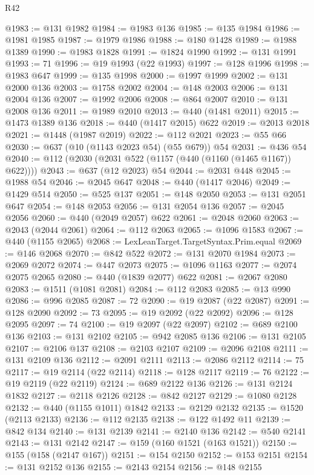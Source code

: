 \begin{lexlean}{R42}
\begin{coremodule}
@1983 := @131 @1982
@1984 := @1983 @136
@1985 := @135 @1984
@1986 := @1981 @1985
@1987 := @1979 @1986
@1988 := @180 @1428
@1989 := @1988 @1389
@1990 := @1983 @1828
@1991 := @1824 @1990
@1992 := @131 @1991
@1993 := 71
@1996 := @19 @1993 (@22 @1993)
@1997 := @128 @1996
@1998 := @1983 @647
@1999 := @135 @1998
@2000 := @1997 @1999
@2002 := @131 @2000 @136
@2003 := @1758 @2002
@2004 := @148 @2003
@2006 := @131 @2004 @136
@2007 := @1992 @2006
@2008 := @864 @2007
@2010 := @131 @2008 @136
@2011 := @1989 @2010
@2013 := @440 (@1481 @2011)
@2015 := @1473 @1389 @136
@2018 := @440 (@1417 @2015) @622
@2019 := @2013 @2018
@2021 := @1448 (@1987 @2019)
@2022 := @112 @2021
@2023 := @55 @66
@2030 := @637 (@10 (@1143 @2023 @54) (@55 @679)) @54
@2031 := @436 @54
@2040 := @112 (@2030 (@2031 @522 (@1157 (@440 (@1160 (@1465 @1167)) @622))))
@2043 := @637 (@12 @2023) @54
@2044 := @2031 @448
@2045 := @1988 @54
@2046 := @2045 @647
@2048 := @440 (@1417 @2046)
@2049 := @1429 @514
@2050 := @525 @137
@2051 := @148 @2050
@2053 := @131 @2051 @647
@2054 := @148 @2053
@2056 := @131 @2054 @136
@2057 := @2045 @2056
@2060 := @440 (@2049 @2057) @622
@2061 := @2048 @2060
@2063 := @2043 (@2044 @2061)
@2064 := @112 @2063
@2065 := @1096 @1583
@2067 := @440 (@1155 @2065)
@2068 := LexLeanTarget.TargetSyntax.Prim.equal
@2069 := @146 @2068
@2070 := @842 @522
@2072 := @131 @2070 @1984
@2073 := @2069 @2072
@2074 := @447 @2073
@2075 := @1096 @1163
@2077 := @2074 @2075 @2065
@2080 := @440 (@1839 @2077) @622
@2081 := @2067 @2080
@2083 := @1511 (@1081 @2081)
@2084 := @112 @2083
@2085 := @13 @990
@2086 := @996 @2085
@2087 := 72
@2090 := @19 @2087 (@22 @2087)
@2091 := @128 @2090
@2092 := 73
@2095 := @19 @2092 (@22 @2092)
@2096 := @128 @2095
@2097 := 74
@2100 := @19 @2097 (@22 @2097)
@2102 := @689 @2100 @136
@2103 := @131 @2102
@2105 := @942 @2085 @136
@2106 := @131 @2105
@2107 := @2106 @137
@2108 := @2103 @2107
@2109 := @2096 @2108
@2111 := @131 @2109 @136
@2112 := @2091 @2111
@2113 := @2086 @2112
@2114 := 75
@2117 := @19 @2114 (@22 @2114)
@2118 := @128 @2117
@2119 := 76
@2122 := @19 @2119 (@22 @2119)
@2124 := @689 @2122 @136
@2126 := @131 @2124 @1832
@2127 := @2118 @2126
@2128 := @842 @2127
@2129 := @1080 @2128
@2132 := @440 (@1155 @1011) @1842
@2133 := @2129 @2132
@2135 := @1520 (@2113 @2133)
@2136 := @112 @2135
@2138 := @122 @1492 @11
@2139 := @842 @134
@2140 := @131 @2139
@2141 := @2140 @136
@2142 := @540 @2141
@2143 := @131 @2142
@2147 := @159 (@160 @1521 (@163 @1521))
@2150 := @155 (@158 (@2147 @167))
@2151 := @154 @2150
@2152 := @153 @2151
@2154 := @131 @2152 @136
@2155 := @2143 @2154
@2156 := @148 @2155

\end{coremodule}
\end{lexlean}
